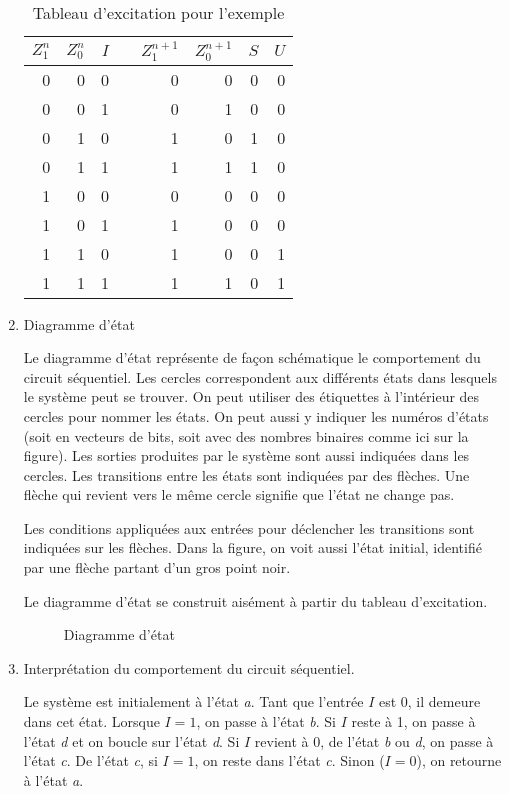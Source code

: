 \documentclass[11pt]{article}
\begin{document}
\begin{enumerate}
\begin{table}[htbp]
\caption{\label{tab:orge654959}Tableau d'excitation pour l'exemple}
\centering
\begin{tabular}{rrrlrrrr}
\(Z_1^n\) & \(Z_0^n\) & \(I\) &  & \(Z_1^{n+1}\) & \(Z_0^{n+1}\) & \(S\) & \(U\)\\
\hline
0 & 0 & 0 &  & 0 & 0 & 0 & 0\\
0 & 0 & 1 &  & 0 & 1 & 0 & 0\\
0 & 1 & 0 &  & 1 & 0 & 1 & 0\\
0 & 1 & 1 &  & 1 & 1 & 1 & 0\\
1 & 0 & 0 &  & 0 & 0 & 0 & 0\\
1 & 0 & 1 &  & 1 & 0 & 0 & 0\\
1 & 1 & 0 &  & 1 & 0 & 0 & 1\\
1 & 1 & 1 &  & 1 & 1 & 0 & 1\\
\end{tabular}
\end{table}

\item Diagramme d'état

Le diagramme d'état représente de façon schématique le comportement du
circuit séquentiel. Les cercles correspondent aux différents états
dans lesquels le système peut se trouver. On peut utiliser des
étiquettes à l'intérieur des cercles pour nommer les états. On peut
aussi y indiquer les numéros d'états (soit en vecteurs de bits, soit
avec des nombres binaires comme ici sur la figure). Les sorties
produites par le système sont aussi indiquées dans les cercles.  Les
transitions entre les états sont indiquées par des flèches. Une flèche
qui revient vers le même cercle signifie que l'état ne change pas.

Les conditions appliquées aux entrées pour déclencher les transitions
sont indiquées sur les flèches. Dans la figure, on voit aussi l'état
initial, identifié par une flèche partant d'un gros point noir.

Le diagramme d'état se construit aisément à partir du tableau
d'excitation.

\begin{figure}[htbp]
\centering

\caption{\label{fig:orgcc0486e}Diagramme d'état}
\end{figure}

\item Interprétation du comportement du circuit séquentiel.

Le système est initialement à l'état \emph{a}. Tant que l'entrée \(I\) est 0,
il demeure dans cet état. Lorsque \(I=1\), on passe à l'état \emph{b}. Si
\(I\) reste à 1, on passe à l'état \emph{d} et on boucle sur l'état \emph{d}. Si
\(I\) revient à 0, de l'état \emph{b} ou \emph{d}, on passe à l'état \emph{c}. De l'état \emph{c},
si \(I = 1\), on reste dans l'état \emph{c}. Sinon (\(I = 0\)), on retourne à
l'état \emph{a}.


\end{enumerate}
\end{document}
